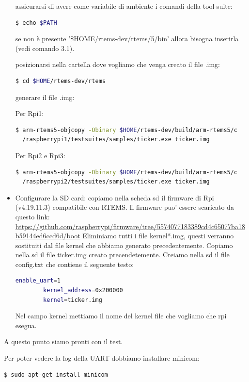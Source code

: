 \documentclass[12pt, a4paper]{article}
\begin{document}
\begin{flushleft}
\begin{itemize}
assicurarsi di avere come variabile di ambiente i comandi della tool-suite:
\begin{lstlisting}[language=bash] 
$ echo $PATH
\end{lstlisting}
se non è presente  '\$HOME/rtems-dev/rtems/5/bin' allora bisogna inserirla (vedi comando 3.1).

posizionarsi nella cartella dove vogliamo che venga creato il file .img:
\begin{lstlisting}[language=bash] 
$ cd $HOME/rtems-dev/rtems 
\end{lstlisting}		

generare il file .img:

Per Rpi1: 
\begin{lstlisting}[language=bash] 
$ arm-rtems5-objcopy -Obinary $HOME/rtems-dev/build/arm-rtems5/c 
  /raspberrypi1/testsuites/samples/ticker.exe ticker.img
\end{lstlisting}
Per Rpi2 e Rpi3: 
\begin{lstlisting}[language=bash ] 
$ arm-rtems5-objcopy -Obinary $HOME/rtems-dev/build/arm-rtems5/c
  /raspberrypi2/testsuites/samples/ticker.exe ticker.img
\end{lstlisting}

\item Configurare la SD card:
copiamo nella scheda sd il firmware di Rpi (v4.19.11.3) compatibile con RTEMS. 
Il firmware puo' essere scaricato da questo link:  \\
\small\url{https://github.com/raspberrypi/firmware/tree/5574077183389cd4c65077ba18b59144ed6ccd6d/boot}
Eliminiamo tutti i file kernel*.img, questi verranno sostituiti dal file 
kernel che abbiamo generato precedentemente.
Copiamo nella sd il file ticker.img creato precendetemente.
Creiamo nella sd il file config.txt che contiene il seguente testo:
\begin{lstlisting}[language=bash ] 
		enable_uart=1
		kernel_address=0x200000
 		kernel=ticker.img 
\end{lstlisting}
Nel campo kernel mettiamo il nome del kernel file che vogliamo che rpi esegua.
\end{itemize}
	
\newpage
 	 
A questo punto siamo pronti con il test.

Per poter vedere la log della UART dobbiamo installare minicom:
\begin{lstlisting}[language=bash] 
$ sudo apt-get install minicom
\end{lstlisting}


\end{flushleft}
\end{document}
